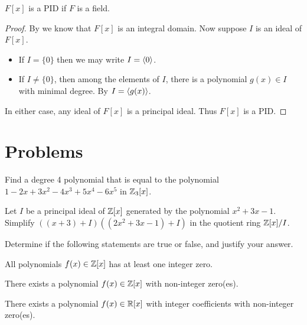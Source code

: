 \begin{theorem}
    $F[x]$ is a PID if $F$ is a field.
\end{theorem}
\begin{proof}
    By  we know that $F[x]$ is an integral domain. Now suppose $I$ is an ideal of $F[x]$.
    \begin{itemize}
        \item If $I = \{0\}$ then we may write $I = \left\langle0\right\rangle$.
        \item If $I \neq \{0\}$, then among the elements of $I$, there is a polynomial $g(x) \in I$ with minimal degree. By  $I = \left\langle g(x)\right\rangle$.
    \end{itemize}
    In either case, any ideal of $F[x]$ is a principal ideal. Thus $F[x]$ is a PID.
\end{proof}

\newpage

\section{Problems}
\begin{problem}
    Find a degree 4 polynomial that is equal to the polynomial $1 - 2x + 3x^2 - 4x^3 + 5x^4 - 6x^5$ in $\mathbb{Z}_3[x]$.
\end{problem}

\begin{problem}
    Let $I$ be a principal ideal of $\mathbb{Z}[x]$ generated by the polynomial $x^2 + 3x - 1$. Simplify $\left((x + 3) + I\right)\left((2x^2 + 3x - 1) + I\right)$ in the quotient ring $\mathbb{Z}[x]/I$.
\end{problem}

\begin{problem}
    Determine if the following statements are true or false, and justify your answer.
    \begin{partquestions}{\alph*}
        \item All polynomials $f(x) \in \mathbb{Z}[x]$ has at least one integer zero.
        \item There exists a polynomial $f(x) \in \mathbb{Z}[x]$ with non-integer zero(es).
        \item There exists a polynomial $f(x) \in \mathbb{R}[x]$ with integer coefficients with non-integer zero(es).
    \end{partquestions}
\end{problem}

